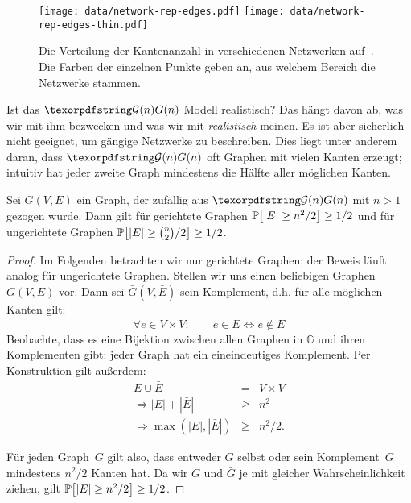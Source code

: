 \begin{figure}[t]
    \begin{center}
        \texttt{[image: data/network-rep-edges.pdf]}%
        \texttt{[image: data/network-rep-edges-thin.pdf]}%
    \end{center}
    \caption{
        Die Verteilung der Kantenanzahl in verschiedenen Netzwerken auf~\cite{networkrepository}.
        Die Farben der einzelnen Punkte geben an, aus welchem Bereich die Netzwerke stammen.
    }
    \label{fig:kantenanzahl}
\end{figure}

Ist das $\Gn$ Modell realistisch?
Das hängt davon ab, was wir mit ihm bezwecken und was wir mit \emph{realistisch} meinen.
Es ist aber sicherlich nicht geeignet, um gängige Netzwerke zu beschreiben.
Dies liegt unter anderem daran, dass $\Gn$ oft Graphen mit vielen Kanten erzeugt;
intuitiv hat \glqq jeder zweite Graph\grqq{} mindestens die Hälfte aller möglichen Kanten.

\begin{observation}
    Sei $G(V,E)$ ein Graph, der zufällig aus $\Gn$ mit $n > 1$ gezogen wurde.
    Dann gilt für gerichtete Graphen $\mathbb{P}\!\left[|E| \ge n^2 / 2\right] \ge 1/2$ und für ungerichtete Graphen $\mathbb{P}\!\left[|E| \ge \binom{n}{2} / 2\right] \ge 1/2$.
\end{observation}

\begin{proof}
    Im Folgenden betrachten wir nur gerichtete Graphen; der Beweis läuft analog für ungerichtete Graphen.
    Stellen wir uns einen beliebigen Graphen~$G(V, E)$ vor.
    Dann sei $\bar G(V, \bar E)$ sein Komplement, d.h. für alle möglichen Kanten gilt:
    \begin{equation}
        \forall e \in V\times V\colon \quad\quad e \in \bar E \Leftrightarrow e \notin E
    \end{equation}
    Beobachte, dass es eine Bijektion zwischen allen Graphen in $\mathbb G$ und ihren Komplementen gibt: jeder Graph hat ein eineindeutiges Komplement.
    Per Konstruktion gilt außerdem:
    \begin{eqnarray}
        E \cup \bar E &=& V \times V\\
        \Rightarrow |E| + |\bar E| &\ge& n^2\\
        \Rightarrow \max(|E|, |\bar E|) &\ge& n^2 / 2.
    \end{eqnarray}

    Für jeden Graph~$G$ gilt also, dass entweder $G$ selbst oder sein Komplement~$\bar G$ mindestens $n^2 / 2$ Kanten hat.
    Da wir $G$ und $\bar G$ je mit gleicher Wahrscheinlichkeit ziehen, gilt $\mathbb{P}\!\left[|E| \ge n^2 / 2\right] \ge 1/2$.
\end{proof}

